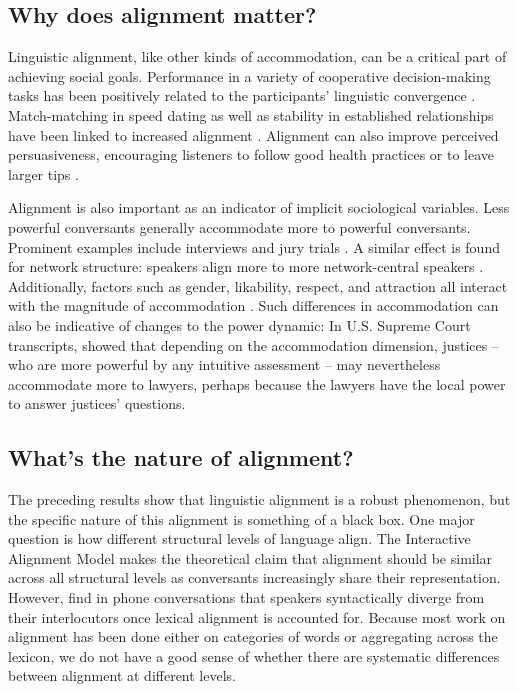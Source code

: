 \documentclass[11pt]{article}
\begin{document}
\subsection{Why does alignment matter?}
Linguistic alignment, like other kinds of accommodation, can be a critical part of achieving social goals.  Performance in a variety of cooperative decision-making tasks has been positively related to the participants' linguistic convergence \cite{FusaroliEtAl2012,KacewiczEtAl2013}.  Match-matching in speed dating as well as stability in established relationships have been linked to increased alignment \cite{IrelandEtAl2011}.  Alignment can also improve perceived persuasiveness, encouraging listeners to follow good health practices \cite{KlineCeropski1984} or to leave larger tips \cite{vanBaarenEtAl2003}.

Alignment is also important as an indicator of implicit sociological variables. Less powerful conversants generally accommodate more to powerful conversants. Prominent examples include interviews and jury trials \cite{WillemynsEtAl1997,Gnisci2005,DNMEtAl2012}.  A similar effect is found for network structure: speakers align more to more network-central speakers \cite{NobleFernandez2015}.  Additionally, factors such as gender, likability, respect, and attraction all interact with the magnitude of accommodation \cite{BilousKrauss1988,Natale1975}. Such differences in accommodation can also be indicative of changes to the power dynamic: In U.S. Supreme Court transcripts, \cite{guo2015} showed that depending on the accommodation dimension, justices -- who are more powerful by any intuitive assessment -- may nevertheless accommodate more to lawyers, perhaps because the lawyers have the local power to answer justices' questions.

\subsection{What's the nature of alignment?}
The preceding results show that linguistic alignment is a robust phenomenon, but the specific nature of this alignment is something of a black box. One major question is how different structural levels of language align. The Interactive Alignment Model \cite{PickeringGarrod2004} makes the theoretical claim that alignment should be similar across all structural levels as conversants increasingly share their representation. However, \cite{HealeyPurverHowes2014} find in phone conversations that speakers syntactically diverge from their interlocutors once lexical alignment is accounted for.  Because most work on alignment has been done either on categories of words or aggregating across the lexicon, we do not have a good sense of whether there are systematic differences between alignment at different levels.
\end{document}
